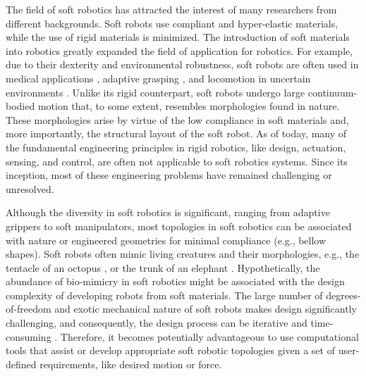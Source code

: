 The field of soft robotics has attracted the interest of many researchers from different backgrounds. Soft robots use compliant and hyper-elastic materials, while the use of rigid materials is minimized. The introduction of soft materials into robotics greatly expanded the field of application for robotics. For example, due to their dexterity and environmental robustness, soft robots are often used in medical applications \cite{Polygerinos2015b, Yap2015, Asbeck2015}, adaptive grasping \cite{Galloway2016, Hughes2016}, and locomotion in uncertain environments \cite{Drotman2017}. Unlike its rigid counterpart, soft robots undergo large continuum-bodied motion that, to some extent, resembles morphologies found in nature. These morphologies arise by virtue of the low compliance in soft materials and, more importantly, the structural layout of the soft robot. As of today, many of the fundamental engineering principles in rigid robotics, like design, actuation, sensing, and control, are often not applicable to soft robotics systems. Since its inception, most of these engineering problems have remained challenging or unresolved.

Although the diversity in soft robotics is significant, ranging from adaptive grippers to soft manipulators, most topologies in soft robotics can be associated with nature or engineered geometries for minimal compliance (e.g., bellow shapes). Soft robots often mimic living creatures and their morphologies, e.g., the tentacle of an octopus \cite{Galloway2016, Wehner2016}, or the trunk of an elephant \cite{Drotman2017}. Hypothetically, the abundance of bio-mimicry in soft robotics might be associated with the design complexity of developing robots from soft materials. The large number of degrees-of-freedom and exotic mechanical nature of soft robots makes design significantly challenging, and consequently, the design process can be iterative and time-consuming \cite{Wehner2016}. Therefore, it becomes potentially advantageous to use computational tools that assist or develop appropriate soft robotic topologies given a set of user-defined requirements, like desired motion or force.

